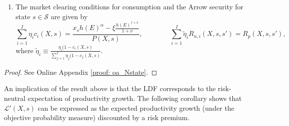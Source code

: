 \begin{proposition}
\begin{enumerate}
\item The market clearing conditions for consumption and the Arrow security for state $s\in \mathcal{S}$ are given by
\begin{equation}
\sum_{i=1}^I \eta_i c_i(X,s) = \frac{ x_s h(E)^\alpha - \xi \frac{h(E)^{1+\nu}}{1+\nu}}{P(X,s)}, \qquad \qquad   \sum_{i=1}^I \tilde{\eta}_i R_{n,i}(X,s,s') = R_p(X,s,s'),
\end{equation}
where $\tilde{\eta}_i \equiv \frac{\eta_i (1-c_i(X,s)}{\sum_{j=1}^I \eta_j (1-c_j(X,s)}$.
\end{enumerate}
\end{proposition}

\begin{proof}
See Online Appendix \ref{proof: oa_Nstate}.
\end{proof}

An implication of the result above is that the LDF corresponds to the risk-neutral expectation of productivity growth. 
The following corollary shows that $\mathcal{L}'(X,s)$ can be expressed as the expected productivity growth (under the objective probability measure) discounted by a risk premium.

